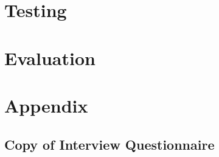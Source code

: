 \documentclass{article}
\begin{document}
	
	
	

	\section {  Testing }

	\section {  Evaluation }

	\section { Appendix  }

	\subsection{Copy of Interview Questionnaire}
\end{document}
